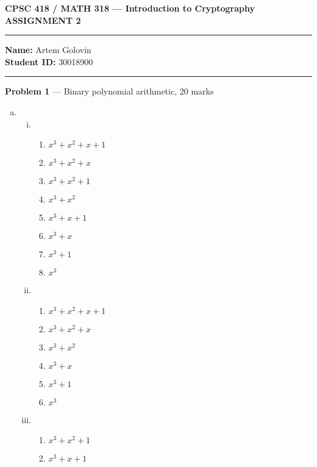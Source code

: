 \documentclass[11pt]{article}
\theoremstyle{definition}
\begin{document}
\begin{center}

  \bf \Large CPSC 418 / MATH 318 --- Introduction to Cryptography \\
  ASSIGNMENT 2

\end{center}


\medskip \hrule
  \textbf{Name:} Artem Golovin \\
  \textbf{Student ID:} 30018900
\medskip \hrule

\item[] \textbf{Problem 1} --- Binary polynomial arithmetic, 20 marks

\begin{enumerate}[a.]

  \item
    \begin{enumerate}[i. ]
      \item
        \begin{enumerate}[1. ]
          \item $x^3 + x^2 + x + 1$
          \item $x^3 + x^2 + x$
          \item $x^3 + x^2 + 1$
          \item $x^3 + x^2$
          \item $x^3 + x + 1$
          \item $x^3 + x$
          \item $x^3 + 1$ 
          \item $x^3$
        \end{enumerate}
      \item
        \begin{enumerate}[1. ]
          \item $x^3 + x^2 + x + 1$
          \item $x^3 + x^2 + x$
          \item $x^3 + x^2$
          \item $x^3 + x$
          \item $x^3 + 1$ 
          \item $x^3$
        \end{enumerate}
      \item
        \begin{enumerate}[1. ]
          \item $x^3 + x^2 + 1$
          \item $x^3 + x + 1$
        \end{enumerate}

    \end{enumerate}

\end{enumerate}

\newpage
\end{document}
